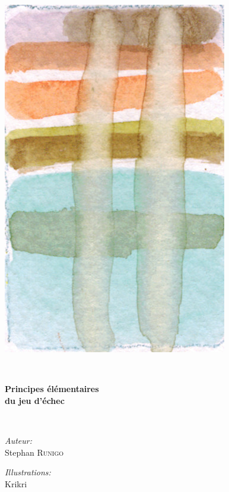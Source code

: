 \begin{titlepage}
%

\begin{center}
\includegraphics[scale=2]{./presentation/champ06}
\end{center}

\textsc{\Large }\\[0.5cm]

\HRule

\begin{center}
{\huge \bfseries  Principes élémentaires\\
du jeu d'échec\\[0.4cm] }
\end{center}

\HRule \\[1.5cm]

\begin{minipage}{0.4\textwidth}
\begin{flushleft} \large
\emph{Auteur:}\\
Stephan \textsc{Runigo}
\end{flushleft}
\end{minipage}
\begin{minipage}{0.4\textwidth}
\begin{flushright} \large
\emph{Illustrations:}\\
Krikri
\end{flushright}
\end{minipage}


\end{titlepage}
